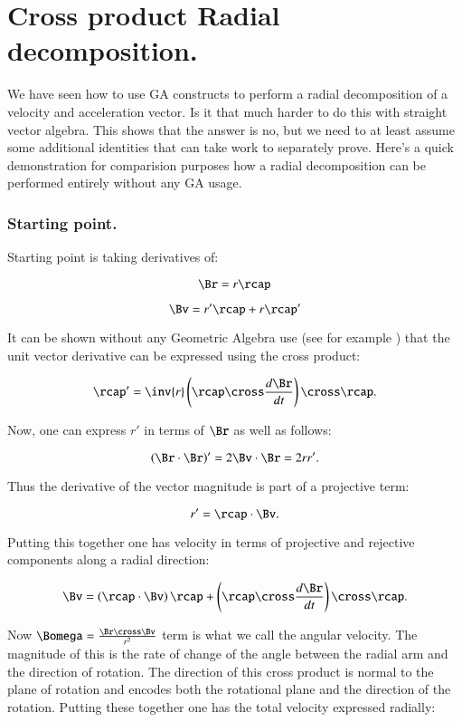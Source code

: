 \chapter{Cross product Radial decomposition.}\label{chap:PJAngAccCross}

We have seen how to use GA constructs to perform a radial 
decomposition of a velocity and acceleration vector.  Is it that
much harder to do this with straight vector algebra.  This shows that
the answer is no, but we need to at least assume some additional
identities that can take work to separately prove.  Here's a quick
demonstration for comparision purposes how a radial decomposition 
can be performed entirely without any GA usage.

\subsection{Starting point.}

Starting point is taking derivatives of:

\[
\Br = r \rcap
\]

\[
\Bv = r' \rcap + r \rcap'
\]

It can be shown without any Geometric Algebra use (see for example \cite{salas1990coa}) that the unit vector derivative can be expressed using the cross product:

\[
\rcap' = \inv{r} \left(\rcap \cross \frac{d\Br}{dt}\right) \cross \rcap.
\]

Now, one can express $r'$ in terms of $\Br$ as well as follows:

\[
\left(\Br \cdot \Br\right)' = 2 \Bv \cdot \Br = 2 r r'.
\]

Thus the derivative of the vector magnitude is part of a projective term:

\[
r' = \rcap \cdot \Bv.
\]

Putting this together one has velocity in terms of projective and rejective
components along a radial direction:

\[
\Bv = \left(\rcap \cdot \Bv\right) \rcap + \left(\rcap \cross \frac{d\Br}{dt}\right) \cross \rcap.
\]

Now $\Bomega = \frac{\Br \cross \Bv}{r^2}$ term is what we call the angular velocity.  The magnitude of this
is the rate of change of the angle between the radial arm and the direction of rotation.  The direction of this
cross product is normal to the plane of rotation and encodes both the rotational plane and the direction of the
rotation.  Putting these together one has the total velocity expressed radially:

